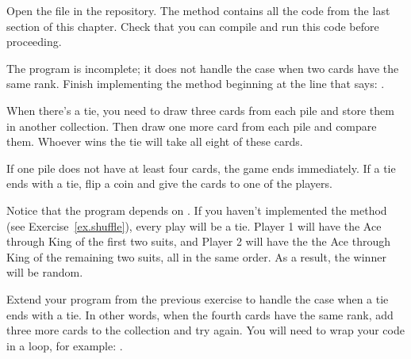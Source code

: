 \begin{exercise}  %

Open the file  in the repository.
The  method contains all the code from the last section of this chapter.
Check that you can compile and run this code before proceeding.

The program is incomplete; it does not handle the case when two cards have the same rank.
Finish implementing the  method beginning at the line that says: .

When there's a tie, you need to draw three cards from each pile and store them in another collection.
Then draw one more card from each pile and compare them.
Whoever wins the tie will take all eight of these cards.

If one pile does not have at least four cards, the game ends immediately.
If a tie ends with a tie, flip a coin and give the cards to one of the players.

Notice that the program depends on .
If you haven't implemented the  method (see Exercise~\ref{ex.shuffle}), every play will be a tie.
Player 1 will have the Ace through King of the first two suits, and Player 2 will have the the Ace through King of the remaining two suits, all in the same order.
As a result, the winner will be random.

\end{exercise}


\begin{exercise}  %

Extend your program from the previous exercise to handle the case when a tie ends with a tie.
In other words, when the fourth cards have the same rank, add three more cards to the collection and try again.
You will need to wrap your code in a loop, for example: .

\end{exercise}
